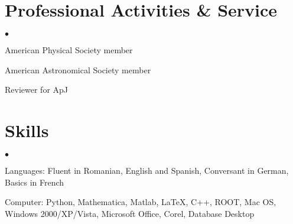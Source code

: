 \documentclass[margin,line]{res}
\newenvironment{list2}{
  \begin{list}{$\bullet$}{%
      \setlength{\itemsep}{0in}
      \setlength{\parsep}{0in} \setlength{\parskip}{0in}
      \setlength{\topsep}{0in} \setlength{\partopsep}{0in} 
      \setlength{\leftmargin}{0.2in}}}{\end{list}}
\begin{document}
\begin{resume}
\section{\sc Professional Activities \& Service}
\begin{list2}
\item[] American Physical Society member
\item[] American Astronomical Society member
\item[] Reviewer for ApJ
\end{list2}

\section{\sc Skills}
\begin{list2}
\item[] Languages: Fluent in Romanian, English and Spanish, Conversant in German, Basics in French
\item[] Computer: Python, Mathematica, Matlab, LaTeX, C++, ROOT, Mac OS, Windows 2000/XP/Vista, Microsoft Office, Corel, Database Desktop
\end{list2}








\end{resume}
\end{document}

